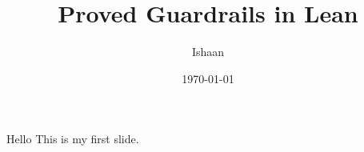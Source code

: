 \documentclass{beamer}
\title{Proved Guardrails in Lean}
\author{Ishaan}
\date{\today}
\begin{document}
\maketitle

\begin{frame}{Hello}
  This is my first slide.
\end{frame}
\end{document}
